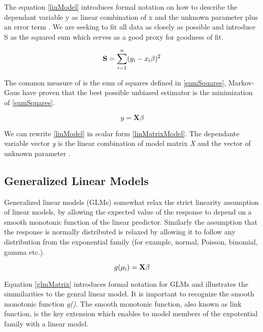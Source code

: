 \documentclass{article}
\begin{document}
    The equation \ref{linModel} introduces formal notation on how to describe the dependant variable y as linear combination of x and the unknown parameter \textbeta plus an error term \textepsilon. We are seeking \textbeta to fit all data as closely as possible and introduce S as the squared sum which serves as a good proxy for goodness of fit.

    \begin{equation} \label{sumSquares} \mathbf{S} =  \sum_{i=1}^{n}(y\textsubscript{i} - x\textsubscript{i}\beta)^{2} \end{equation}

    The common measure of \textbeta is the sum of squares defined in \ref{sumSquares}, Markov-Gaus have proven that the best possible unbiased estimator is \textbeta  the minimization of \ref{sumSquares}.

    \begin{equation}  \label{linMatrixModel} y =  \mathbf{X} \beta \end{equation}

    We can rewrite \ref{linModel} in scalar form \ref{linMatrixModel}. The dependante variable vector \textit{y} is the linear combination of model matrix \textit{X} and the vector of unknown parameter \textbeta.

    \subsection{Generalized Linear Models}
    Generalized linear models (GLMs) somewhat relax the strict linearity assumption of linear models, by allowing the expected value of the response to depend on a smooth monotonic function of the linear predictor. Similarly the assumption that the response is normally distributed is relaxed by allowing it to follow any distribution from the exponential family (for example, normal, Poisson, binomial, gamma etc.).

    \begin{equation} \label{glmMatrix} g(\mu\textsubscript{i}) = \mathbf{X} \beta \end{equation}

    Equation \ref{glmMatrix} introduces formal notation for GLMs and illustrates the simmilarities to the genral linear model. It is important to recognize the smooth monotonic function \textit{g()}. The smooth monotonic function, also known as link function, is the key extension which enables to model members of the expotential family with a linear model.
\end{document}
